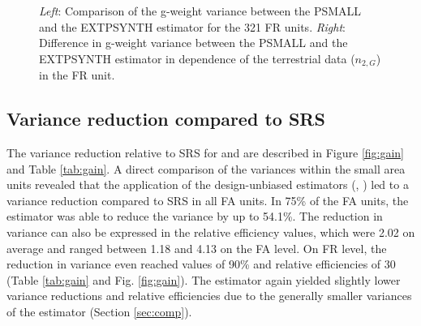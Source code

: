 
\begin{figure}[H]
	\centering
	\caption{\textit{Left}: Comparison of the g-weight variance between the PSMALL and the EXTPSYNTH estimator for the 321 FR units.
		\textit{Right}: Difference in g-weight variance between the PSMALL and the EXTPSYNTH estimator in dependence of the terrestrial data ($n_{2,G}$) in the FR unit.}
	\label{fig:compvar}
\end{figure}




\subsection{Variance reduction compared to SRS}
\label{sec:gain_eval}

The variance reduction relative to SRS for \psmall{} and \extpsynth{} are described in Figure \ref{fig:gain} and Table \ref{tab:gain}. A direct comparison of the variances within the small area units revealed that the application of the design-unbiased estimators (\psmall{}, \extpsynth{}) led to a variance reduction compared to SRS in all FA units. In 75\% of the FA units, the \extpsynth{} estimator was able to reduce the variance by up to 54.1\%. The reduction in variance can also be expressed in the relative efficiency values, which were 2.02 on average and ranged between 1.18 and 4.13 on the FA level. On FR level, the reduction in variance even reached values of 90\% and relative efficiencies of 30 (Table \ref{tab:gain} and Fig. \ref{fig:gain}). The \psmall{} estimator again yielded slightly lower variance reductions and relative efficiencies due to the generally smaller variances of the \extpsynth{} estimator (Section \ref{sec:comp}).

